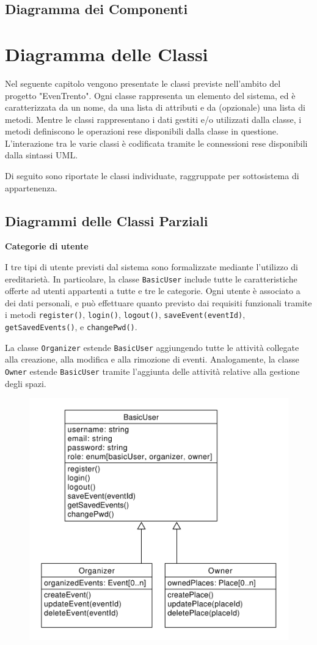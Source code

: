 \documentclass[9pt]{extarticle}
\begin{document}
\subsection{Diagramma dei Componenti}

\newpage

\section{Diagramma delle Classi}

Nel seguente capitolo vengono presentate le classi previste nell'ambito del progetto "EvenTrento". Ogni classe rappresenta un elemento del sistema, ed è caratterizzata da un nome, da una lista di attributi e da (opzionale) una lista di metodi.
Mentre le classi rappresentano i dati gestiti e/o utilizzati dalla classe, i metodi definiscono le operazioni rese disponibili dalla classe in questione. L'interazione tra le varie classi è codificata tramite le connessioni rese disponibili dalla sintassi UML.

Di seguito sono riportate le classi individuate, raggruppate per sottosistema di appartenenza.

\subsection{Diagrammi delle Classi Parziali}

\textbf{Categorie di utente}


I tre tipi di utente previsti dal sistema sono formalizzate mediante l'utilizzo di ereditarietà. In particolare, la classe \verb*|BasicUser| include tutte le caratteristiche offerte ad utenti appartenti a tutte e tre le categorie. Ogni utente è associato a dei dati personali, e può effettuare quanto previsto dai requisiti funzionali tramite i metodi \verb*|register()|, \verb*|login()|, \verb*|logout()|, \verb*|saveEvent(eventId)|, \verb*|getSavedEvents()|, e \verb*|changePwd()|.


La classe \verb*|Organizer| estende \verb*|BasicUser| aggiungendo tutte le attività collegate alla creazione, alla modifica e alla rimozione di eventi. Analogamente, la classe \verb*|Owner| estende \verb*|BasicUser| tramite l'aggiunta delle attività relative alla gestione degli spazi.

\begin{figure}[!htb]
	\centering
	\includegraphics[width=.6\linewidth]{./images/classDiagramUsers.pdf}
		\caption{}
	\label{fig:classDiagramUsers}
\end{figure}
\end{document}
